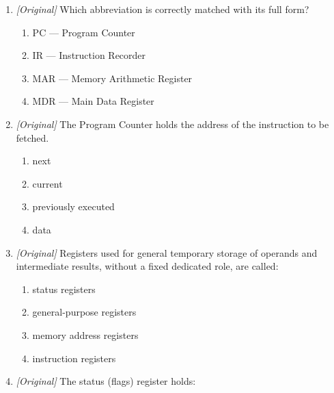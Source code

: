 \begin{enumerate}[label=\textbf{Q\arabic*.}, leftmargin=*]
\begin{enumerate}[label=\Roman*.]
    \item The Control Unit directs the sequence of operations and data flow.
    \item The Control Unit performs the arithmetic calculations.
  \end{enumerate}
  \begin{enumerate}[label=\Alph*.]
    \item I only
    \item I and II only
    \item II and III only
    \item I, II, and III
  \end{enumerate}
\item \textit{[Original]} Which abbreviation is correctly matched with its
  full form?
  \begin{enumerate}[label=\Alph*.]
    \item PC --- Program Counter
    \item IR --- Instruction Recorder
    \item MAR --- Memory Arithmetic Register
    \item MDR --- Main Data Register
  \end{enumerate}
\item \textit{[Original]} The Program Counter holds the address of the
  \underline{\hspace{2.2cm}} instruction to be fetched.
  \begin{enumerate}[label=\Alph*.]
    \item next
    \item current
    \item previously executed
    \item data
  \end{enumerate}
\item \textit{[Original]} Registers used for general temporary storage of
  operands and intermediate results, without a fixed dedicated role, are
  called:
  \begin{enumerate}[label=\Alph*.]
    \item status registers
    \item general-purpose registers
    \item memory address registers
    \item instruction registers
  \end{enumerate}
\item \textit{[Original]} The status (flags) register holds:
  \begin{enumerate}[label=\Alph*.]

\end{enumerate}
\end{enumerate}
